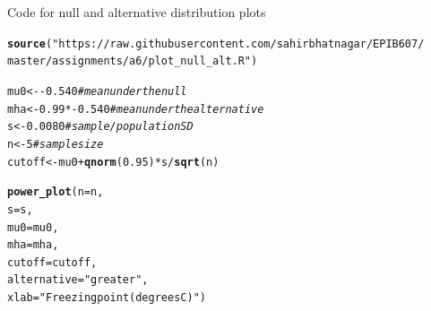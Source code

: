 \documentclass[handout]{beamer}\usepackage[]{graphicx}\usepackage[]{color}
\newcommand{\hlnum}[1]{\textcolor[rgb]{0.686,0.059,0.569}{#1}}%
\newcommand{\hlstr}[1]{\textcolor[rgb]{0.192,0.494,0.8}{#1}}%
\newcommand{\hlcom}[1]{\textcolor[rgb]{0.678,0.584,0.686}{\textit{#1}}}%
\newcommand{\hlopt}[1]{\textcolor[rgb]{0,0,0}{#1}}%
\newcommand{\hlstd}[1]{\textcolor[rgb]{0.345,0.345,0.345}{#1}}%
\newcommand{\hlkwb}[1]{\textcolor[rgb]{0.69,0.353,0.396}{#1}}%
\newcommand{\hlkwc}[1]{\textcolor[rgb]{0.333,0.667,0.333}{#1}}%
\newcommand{\hlkwd}[1]{\textcolor[rgb]{0.737,0.353,0.396}{\textbf{#1}}}%
\newenvironment{knitrout}{}{} %
\begin{document}
\begin{frame}[fragile]{Code for null and alternative distribution plots}
\begin{knitrout}\scriptsize
{}\color{fgcolor}
\begin{alltt}
\hlkwd{source}\hlstd{(}\hlstr{"https://raw.githubusercontent.com/sahirbhatnagar/EPIB607/
master/assignments/a6/plot_null_alt.R"}\hlstd{)}

\hlstd{mu0} \hlkwb{<-} \hlopt{-}\hlnum{0.540} \hlcom{# mean under the null}
\hlstd{mha} \hlkwb{<-} \hlnum{0.99}\hlopt{*-}\hlnum{0.540} \hlcom{# mean under the alternative}
\hlstd{s} \hlkwb{<-} \hlnum{0.0080} \hlcom{# sample/population SD}
\hlstd{n} \hlkwb{<-} \hlnum{5} \hlcom{# sample size}
\hlstd{cutoff} \hlkwb{<-} \hlstd{mu0} \hlopt{+} \hlkwd{qnorm}\hlstd{(}\hlnum{0.95}\hlstd{)} \hlopt{*} \hlstd{s} \hlopt{/} \hlkwd{sqrt}\hlstd{(n)}

\hlkwd{power_plot}\hlstd{(}\hlkwc{n} \hlstd{= n,}
        \hlkwc{s} \hlstd{= s,}
        \hlkwc{mu0} \hlstd{= mu0,}
        \hlkwc{mha} \hlstd{= mha,}
        \hlkwc{cutoff} \hlstd{= cutoff,}
        \hlkwc{alternative} \hlstd{=} \hlstr{"greater"}\hlstd{,}
        \hlkwc{xlab} \hlstd{=} \hlstr{"Freezing point (degrees C)"}\hlstd{)}
\end{alltt}

\end{knitrout}
\end{frame}
\end{document}
